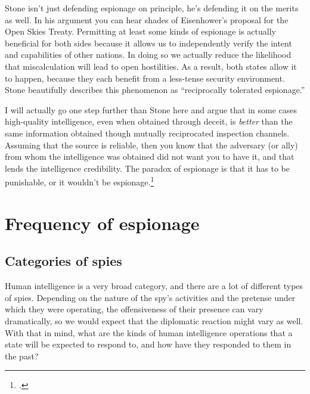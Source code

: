 \documentclass{memoir}
\begin{document}
\begin{refsegment}

Stone isn't just defending espionage on principle, he's defending it on the merits as well. In his argument you can hear shades of Eisenhower's proposal for the Open Skies Treaty. Permitting at least some kinds of espionage is actually beneficial for both sides because it allows us to independently verify the intent and capabilities of other nations. In doing so we actually reduce the likelihood that miscalculation will lead to open hostilities. As a result, both states allow it to happen, because they each benefit from a less-tense security environment. Stone beautifully describes this phenomenon as ``reciprocally tolerated espionage.''


I will actually go one step further than Stone here and argue that in some cases high-quality intelligence, even when obtained through deceit, is \emph{better} than the same information obtained though mutually reciprocated inspection channels. Assuming that the source is reliable, then you know that the adversary (or ally) from whom the intelligence was obtained did not want you to have it, and that lends the intelligence credibility. The paradox of espionage is that it has to be punishable, or it wouldn't be espionage.\footcite[p.~347]{demarest_espionage_1995}



\section{Frequency of espionage}
\subsection{Categories of spies}
Human intelligence is a very broad category, and there are a lot of different types of spies. Depending on the nature of the spy's activities and the pretense under which they were operating, the offensiveness of their presence can vary dramatically, so we would expect that the diplomatic reaction might vary as well. With that in mind, what are the kinds of human intelligence operations that a state will be expected to respond to, and how have they responded to them in the past?


\end{refsegment}
\end{document}

